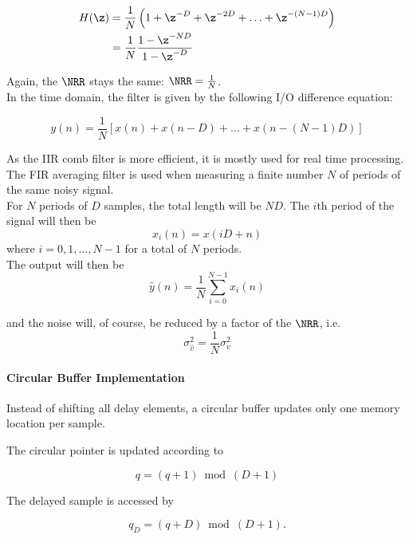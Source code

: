 \begin{align*}
	H(\z)&=\frac{1}{N}\left( 1+ \z^{-D}+\z^{-2D}+\ldots + \z^{-(N-1)D} \right) \\
	&= \frac{1}{N}\frac{1-\z^{-ND}}{1-\z^{-D}}
\end{align*}

Again, the $\NRR$ stays the same: $\NRR = \frac{1}{N}$. \\

In the time domain, the filter is given by the following I/O difference equation:

\begin{equation*}
	y(n) = \frac{1}{N} \left[ x(n)+x(n-D)+\ldots+x(n-(N-1)D) \right]
\end{equation*}

As the IIR comb filter is more efficient, it is mostly used for real time
processing. The FIR averaging filter is used when measuring a finite number
$N$ of periods of the same noisy signal. \\

For $N$ periods of $D$ samples, the total length will be $ND$. The $i$th period
of the signal will then be
\begin{equation*}
	x_i(n) = x(iD+n)
\end{equation*}
where $i=0,1,\ldots,N-1$ for a total of $N$ periods. \\

The output will then be
\begin{equation*}
	\hat{y}(n)=\frac{1}{N}\sum_{i=0}^{N-1}x_i(n)
\end{equation*}

and the noise will, of course, be reduced by a factor of the $\NRR$, i.e.
\begin{equation*}
	\sigma_{\hat{v}}^2 = \frac{1}{N} \sigma_v^2
\end{equation*}

\paragraph{Circular Buffer Implementation}

Instead of shifting all delay elements, a circular buffer updates only
one memory location per sample.

The circular pointer is updated according to

\[
q=(q+1)\bmod(D+1)
\]

The delayed sample is accessed by

\[
q_D=(q+D)\bmod(D+1).
\]

